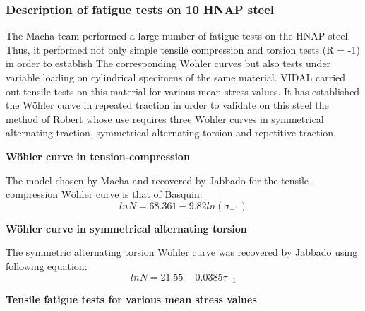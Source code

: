 \documentclass[3p,times,number,review]{elsarticle}
\begin{document}
\subsubsection{Description of fatigue tests on 10 HNAP steel}
The Macha team performed a large number of fatigue tests on the HNAP steel. Thus, it performed not only simple tensile compression and torsion tests (R = -1) in order to establish The corresponding Wöhler curves but also tests under variable loading on cylindrical specimens of the same material\cite{ACHTELIC1994}. VIDAL\cite{VIDAL1996} carried out tensile tests on this material for various mean stress values. It has established the Wöhler curve in repeated traction in order to validate on this steel the method of Robert whose use requires three Wöhler curves in symmetrical alternating traction, symmetrical alternating torsion and repetitive traction.

\vspace{6pt}
\noindent
\textbf{Wöhler curve in tension-compression}

The model chosen by Macha and recovered by Jabbado\cite{jabbado:pastel-00002116} for the tensile-compression Wöhler curve is that of Basquin:
\begin{equation}
lnN=68.361 − 9.82ln\left( \sigma_{-1}\right) 
\end{equation}

\noindent
\textbf{Wöhler curve in symmetrical alternating torsion}

The symmetric alternating torsion Wöhler curve was recovered by Jabbado\cite{jabbado:pastel-00002116} using following equation:
\begin{equation}
lnN=21.55 − 0.0385\tau_{-1}
\end{equation}

\noindent
\textbf{Tensile fatigue tests for various mean stress values}
\end{document}

